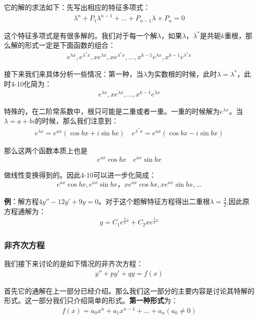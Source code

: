 \documentclass{ctexart}
\let\oldtextbf\textbf
\renewcommand{\textbf}[1]{\textcolor{brown!50!red}{\oldtextbf{#1}}}
\begin{document}
它的解的求法如下：先写出相应的特征多项式：
\begin{align*}
\lambda^n+P_1\lambda^{n-1}+...+P_{n-1}\lambda+P_n=0
\end{align*}

这个特征多项式是有很多解的。我们对于每一个解$\lambda$，如果$\lambda，\lambda^*$是共轭$k$重根，那么解的形式一定是下面函数的组合：
\begin{align*}
e^{\lambda x},e^{\lambda^*x},xe^{\lambda x},xe^{\lambda^*x},...,
x^{k-1}e^{\lambda x},x^{k-1}e^{\lambda^*x}\tag{4-10} 
\end{align*}

接下来我们来具体分析一些情况：第一种，当$\lambda$为实数根的时候，此时$\lambda=\lambda^*$，此时4-10化简为：
\begin{align*}
e^{\lambda x},xe^{\lambda x},...,
x^{k-1}e^{\lambda x}\tag{4-11} 
\end{align*}

特殊的，在二阶常系数中，根只可能是二重或者一重。一重的时候解为$e^{\lambda x}$。当$\lambda=a+bi$的时候，那么我们注意到：
\begin{align*}
e^{\lambda x}=e^{ax}(\cos bx+i\sin bx)\quad e^{\lambda^* x}=e^{ax}(\cos bx-i\sin bx)
\end{align*}

那么这两个函数本质上也是
\begin{align*}
e^{ax}\cos bx\quad e^{ax}\sin bx
\end{align*}

做线性变换得到的。因此4-10可以进一步化简成：
\begin{align*}
e^{ax}\cos bx,e^{ax}\sin bx，xe^{ax}\cos bx,xe^{ax}\sin bx,...\tag{4-12} 
\end{align*}

\textbf{\color{brown!50!red}例}：解方程$4y''-12y'+9y=0$。对于这个题解特征方程得出二重根$\lambda=\frac{3}{2}$,因此原方程通解为：
\begin{align*}
    y=C_1e^{\frac{3}{2}x}+C_2xe^{\frac{3}{2}x}
\end{align*}

\subsubsection{非齐次方程}
我们接下来讨论的是如下情况的非齐次方程：
\begin{align*}
    y''+py'+qy=f(x)\tag{4-13}
\end{align*}

首先它的通解在上一部分已经介绍。那么我们这一部分的主要内容是讨论其特解的形式。这一部分我们只介绍简单的形式。\textbf{\color{brown!50!red}第一种形式}为：
\begin{align*}
    f(x)=a_0x^n+a_1x^{n-1}+...+a_n(a_0\neq0)
\end{align*}
\end{document}
